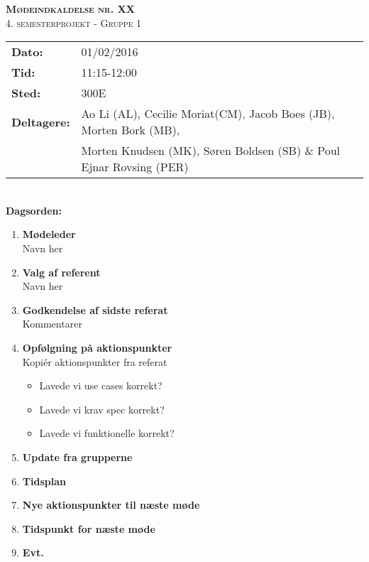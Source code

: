 
\newcommand{\HRule}{\rule{\linewidth}{0.1mm}}


	\begin{center}
		{\huge \bfseries \textsc{Mødeindkaldelse nr. XX}}\\
		\textsc{\large 4. semesterprojekt - Gruppe 1}\\[0.3cm]
	\end{center}
	\begin{tabular}{ll}
	\large \textbf{Dato:} & 01/02/2016  	\\ %
	\large \textbf{Tid:}  & 11:15-12:00 	\\ %
	\large \textbf{Sted:} & 300E			\\ %
	\large \textbf{Deltagere:} & Ao Li (AL), Cecilie Moriat(CM), Jacob Boes (JB), Morten Bork (MB),\\
	\large \textbf & Morten Knudsen (MK), Søren Boldsen (SB) \& Poul Ejnar Rovsing (PER)\\
	\end{tabular}\\
	\phantom{\,}\hspace{0.1em} \large \textbf{Dagsorden:}
	\begin{enumerate}
		\itemsep 0.3em 
		\item \textbf{Mødeleder}\\
			Navn her
		\item \textbf{Valg af referent}\\
			Navn her
		\item \textbf{Godkendelse af sidste referat}\\
			Kommentarer
		\item \textbf{Opfølgning på aktionspunkter}\\
			Kopiér aktionspunkter fra referat
		\begin{itemize}[-]
			\itemsep 0.3em 
			\item Lavede vi use cases korrekt?
			\item Lavede vi krav spec korrekt?
			\item Lavede vi funktionelle korrekt?
		\end{itemize}
		\item \textbf{Update fra grupperne}
		\item \textbf{Tidsplan}
		\item \textbf{Nye aktionspunkter til næste møde}
		\item \textbf{Tidspunkt for næste møde}
		\item \textbf{Evt.}
	\end{enumerate}
